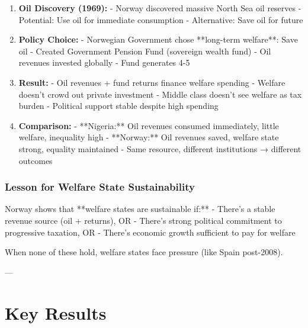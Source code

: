 \begin{enumerate}

\item \textbf{Oil Discovery (1969):}
   - Norway discovered massive North Sea oil reserves
   - Potential: Use oil for immediate consumption
   - Alternative: Save oil for future

\item \textbf{Policy Choice:}
   - Norwegian Government chose **long-term welfare**: Save oil
   - Created Government Pension Fund (sovereign wealth fund)
   - Oil revenues invested globally
   - Fund generates 4-5%

\item \textbf{Result:}
   - Oil revenues + fund returns finance welfare spending
   - Welfare doesn't crowd out private investment
   - Middle class doesn't see welfare as tax burden
   - Political support stable despite high spending

\item \textbf{Comparison:}
   - **Nigeria:** Oil revenues consumed immediately, little welfare, inequality high
   - **Norway:** Oil revenues saved, welfare state strong, equality maintained
   - Same resource, different institutions → different outcomes

\end{enumerate}

\subsubsection{Lesson for Welfare State Sustainability}

Norway shows that **welfare states are sustainable if:**
- There's a stable revenue source (oil + returns), OR
- There's strong political commitment to progressive taxation, OR
- There's economic growth sufficient to pay for welfare

When none of these hold, welfare states face pressure (like Spain post-2008).

---

\clearpage



\section{Key Results}
\label{sec:results}

